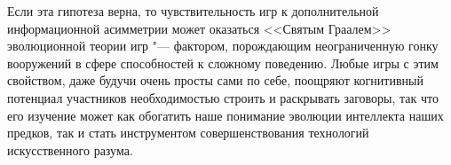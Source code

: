 Если эта гипотеза верна, то чувствительность игр к дополнительной информационной асимметрии может оказаться <<Святым Граалем>> эволюционной теории игр "--- фактором, порождающим неограниченную гонку вооружений в сфере способностей к сложному поведению. Любые игры с этим свойством, даже будучи очень просты сами по себе, поощряют когнитивный потенциал участников необходимостью строить и раскрывать заговоры, так что его изучение может как обогатить наше понимание эволюции интеллекта наших предков, так и стать инструментом совершенствования технологий искусственного разума.

\clearpage